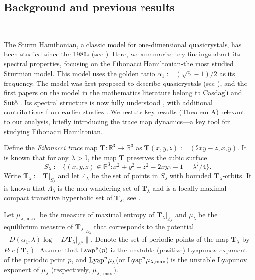 \documentclass[reqno,11pt,graphicx,]{amsart}
\numberwithin{equation}{section}
\theoremstyle{plain}
\newcommand{\R}{{\mathbb R}}
\newcommand{\3}{\mathbf{3}}
\begin{document}
	\subsection{Background and previous results}\
	
	The Sturm Hamiltonian, a classic model for one-dimensional quasicrystals, has been studied since the 1980s (see \cite{Da2007, Da2017}). Here, we summarize key findings about its spectral properties, focusing on the Fibonacci Hamiltonian-the most studied Sturmian model. This model uses the golden ratio $\alpha_1:=(\sqrt{5}-1)/2$ as its frequency. The model was first proposed to describe quasicrystals (see \cite{BIST1989,KKT1983,OPRSS1983}), and the first papers on the model in the mathematics literature belong to Casdagli \cite{Ca1986} and S\"ut\H{o} \cite{Su1987}. Its spectral structure is now fully understood  \cite{DGY2016}, with additional contributions from earlier studies \cite{Ca2009,DEGT2008,DG2009,DG2011,DG2012,DG2013,JL2000,Po2015}. We restate key results (Theorem A) relevant to our analysis, briefly introducing the trace map dynamics—a key tool for studying Fibonacci Hamiltonian.
	
	Define the {\it Fibonacci trace} map $\mathbf T: \R^3\to \R^3$ as $
	\mathbf T(x,y,z):=(2xy-z,x,y).$
	It is known that for any $\lambda>0$, the map $\mathbf T$ preserves the cubic surface
	\begin{equation*}
		S_\lambda:=\{(x,y,z)\in \R^3: x^2+y^2+z^2-2xyz-1=\lambda^2/4\}.
	\end{equation*}
	Write $\mathbf T_\lambda:=\mathbf T|_{S_\lambda}$ and let $\Lambda_\lambda$ be the set of points in $S_\lambda$ with bounded $\mathbf T_\lambda$-orbits. It is known that $\Lambda_\lambda$ is the non-wandering set of $\mathbf T_\lambda$ and is a locally maximal compact transitive hyperbolic set of $\mathbf T_\lambda$, see \cite{Ca2009,Ca1986,DG2009,Me2014}. 
	
	Let $\mu_{\lambda,\max}$ be the measure of maximal entropy of $\mathbf{T}_{\lambda}|_{\Lambda_{\lambda}}$ and $\mu_{\lambda}$ be the equilibrium measure of $\mathbf{T}_{\lambda}|_{\Lambda_\lambda}$ that corresponds to the potential $-D(\alpha_1,\lambda)\log\|D\mathbf{T}_{\lambda}|_{E^u}\|$.  Denote the set of periodic points of the map $\mathbf{T}_{\lambda}$ by $Per(\mathbf{T}_{\lambda})$.
	Assume that ${\rm Lyap}^u(p)$ is the unstable (positive) Lyapunov exponent of the periodic point $p$, and ${\rm Lyap}^u\mu_{\lambda}$(or ${\rm Lyap}^u\mu_{\lambda,\max}$) is the unstable Lyapunov
	exponent of $\mu_{\lambda}$ (respectively, $\mu_{\lambda,\max})$. 
	
\end{document}
